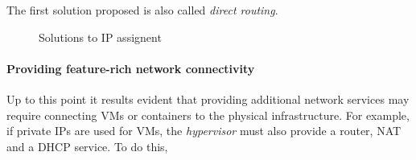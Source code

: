\begin{note}
    The first solution proposed is also called \emph{direct routing}.
\end{note}

\newpage
\begin{figure}[ht!]
    \centering
    \hspace{2cm}
    \caption{Solutions to IP assignent}
\end{figure}

\paragraph{Providing feature-rich network connectivity}
Up to this point it results evident that providing additional network services
may require connecting VMs or containers to the physical infrastructure. For
example, if private IPs are used for VMs, the \emph{hypervisor} must also provide
a router, NAT and a DHCP service. To do this, 